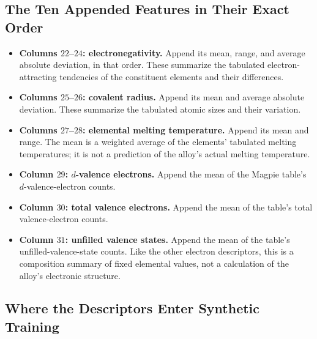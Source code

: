 \documentclass[11pt]{article}
\newenvironment{notes}
  {\begin{itemize}\setlength{\itemsep}{0.45em}\setlength{\parsep}{0pt}}
  {\end{itemize}}
\begin{document}
\subsection{The Ten Appended Features in Their Exact Order}
\label{sec:magpie-feature-order}

\begin{notes}
    \item \textbf{Columns \(22\)--\(24\): electronegativity.}
    Append its mean, range, and average absolute deviation,
    in that order.
    These summarize the tabulated electron-attracting
    tendencies of the constituent elements and their
    differences.

    \item \textbf{Columns \(25\)--\(26\): covalent radius.}
    Append its mean and average absolute deviation.
    These summarize the tabulated atomic sizes and their
    variation.

    \item \textbf{Columns \(27\)--\(28\): elemental melting temperature.}
    Append its mean and range.
    The mean is a weighted average of the elements'
    tabulated melting temperatures; it is not a prediction
    of the alloy's actual melting temperature.

    \item \textbf{Column \(29\): \(d\)-valence electrons.}
    Append the mean of the Magpie table's
    \(d\)-valence-electron counts.

    \item \textbf{Column \(30\): total valence electrons.}
    Append the mean of the table's total
    valence-electron counts.

    \item \textbf{Column \(31\): unfilled valence states.}
    Append the mean of the table's unfilled-valence-state
    counts. Like the other electron descriptors, this is
    a composition summary of fixed elemental values,
    not a calculation of the alloy's electronic structure.
\end{notes}

\subsection{Where the Descriptors Enter Synthetic Training}
\label{sec:magpie-synthetic-integration}
\end{document}
